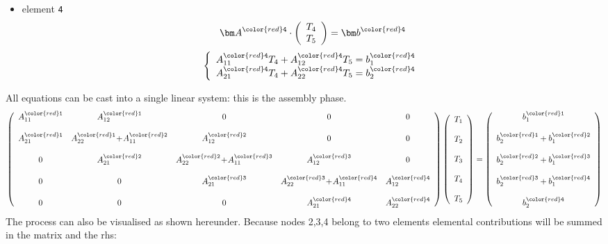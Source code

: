 \begin{itemize}
\item element {\color{red}\tt 4} 
\[
{\bm A}^{\color{red} \tt 4}  \cdot 
\left(
\begin{array}{c}
T_4 \\ T_5
\end{array}
\right)
 =  {\bm b}^{\color{red} \tt 4}
\]
\[
\left\{ 
\begin{array}{l}
A_{11}^{{\color{red}\tt 4}} T_4 + A_{12}^{{\color{red}\tt 4}} T_5 = b^{{\color{red}\tt 4}}_1 \\
A_{21}^{{\color{red}\tt 4}} T_4 + A_{22}^{{\color{red}\tt 4}} T_5 = b^{{\color{red}\tt 4}}_2
\end{array}
\right.
\]
\end{itemize}

All equations can be cast into a single linear system: this is the {\color{olive} assembly} phase.
\[
\left(
\begin{array}{ccccc}
A_{11}^{{\color{red}\tt 1}} &  A_{12}^{{\color{red}\tt 1}} &0&0&0 \\ \\ 
A_{21}^{{\color{red}\tt 1}} &  A_{22}^{{\color{red} \tt 1}} \!+\! A_{11}^{{\color{red}\tt 2}}  & A_{12}^{{\color{red}\tt 2}}   &0&0 \\ \\
0& A_{21}^{{\color{red}\tt 2}} & A_{22}^{{\color{red} \tt 2}} \! +\! A_{11}^{{\color{red}\tt 3}}  & A_{12}^{{\color{red}\tt 3}}   & 0\\ \\
0&0& A_{21}^{{\color{red}\tt 3}}   & A_{22}^{{\color{red}\tt 3}} \! +\! A_{11}^{{\color{red}\tt 4}}   & A_{12}^{{\color{red}\tt 4}}  \\ \\
0&0&0& A_{21}^{{\color{red}\tt 4}}   & A_{22}^{{\color{red}\tt 4}} 
\end{array}
\right)
\left(
\begin{array}{c}
T_1 \\\\ T_2 \\\\ T_3 \\\\ T_4 \\\\ T_5
\end{array}
\right)
=
\left(
\begin{array}{c}
b_{1}^{{\color{red}\tt 1}} \\ \\
b_{2}^{{\color{red}\tt 1}} + b_{1}^{{\color{red}\tt 2}}\\ \\
b_{2}^{{\color{red}\tt 2}} + b_{1}^{{\color{red}\tt 3}}\\ \\
b_{2}^{{\color{red}\tt 3}} + b_{1}^{{\color{red}\tt 4}}\\ \\
b_{2}^{{\color{red}\tt 4}} 
\end{array}
\right)
\]
The process can also be visualised as shown hereunder. Because nodes 2,3,4 belong to two elements 
elemental contributions will be summed in the matrix and the rhs:

